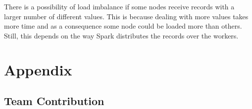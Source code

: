 \documentclass{article}
\begin{document}
    There is a possibility of load imbalance if some nodes receive records with a larger number of different values. This is because dealing with more values takes more time and as a consequence some node could be loaded more than others. Still, this depends on the way Spark distributes the records over the workers.
    
    
\newpage
\appendix
\section{Appendix}\label{appendix}
    \subsection{Team Contribution}
     
\end{document}
